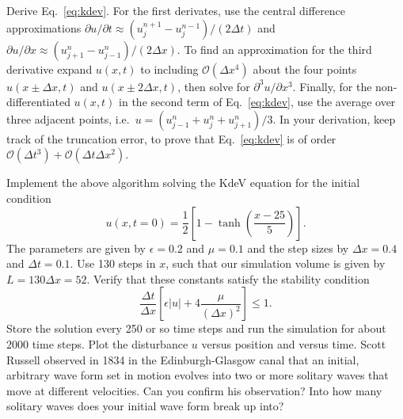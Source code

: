 \documentclass{../project}
\begin{document}
\begin{sheet}[title={Project 4: Partial differential equations (PDEs)}, number=4, due={December 20th, 10am}]
\begin{problem}[title={Solitons}, label=solitons]
  \begin{subproblem}[label=solitons:a,points=4]
    Derive Eq.~\eqref{eq:kdev}. For the first derivates, use the central difference approximations
    $\partial u / \partial t \approx (u_j^{n+1} - u_j^{n-1})/(2\Delta t)$
    and
    $\partial u / \partial x \approx (u_{j+1}^n - u_{j-1}^n)/(2\Delta x)$.
    To find an approximation for the third derivative
    expand $u(x,t)$ to including $\mathcal O(\Delta x^4)$
    about the four points
    $u(x\pm \Delta x, t)$
    and
    $u(x\pm 2\Delta x, t)$,
    then solve for $\partial^3 u / \partial x^3$.
    Finally, for the non-differentiated $u(x,t)$
    in the second term of Eq.~\eqref{eq:kdev},
    use the average over three adjacent points,
    i.e.\ $u = (u_{j-1}^n + u_{j}^n + u_{j+1}^n)/3$.
    In your derivation, keep track of the
    truncation error, to prove that Eq.~\eqref{eq:kdev}
    is of order $\mathcal O(\Delta t^3) + \mathcal O(\Delta t \Delta x^2)$.
  \end{subproblem}

  \begin{subproblem}[label=solitons:b,points=8]
    Implement the above algorithm solving the KdeV equation
    for the initial condition
    \begin{equation}
      u(x,t=0) = \frac12 \left[ 1 - \tanh\left(\frac{x-25}{5}\right)\right].
    \end{equation}
    The parameters are given by $\epsilon = 0.2$ and $\mu=0.1$
    and the step sizes by $\Delta x = 0.4$ and $\Delta t = 0.1$.
    Use 130 steps in $x$, such that our simulation volume
    is given by $L=130\Delta x = 52$.
    Verify that these constants satisfy the stability condition
    \begin{equation}
      \frac{\Delta t}{\Delta x} \left[ \epsilon |u| + 4 \frac{\mu}{(\Delta x)^2}\right] \leq 1.
    \end{equation}
    Store the solution every 250 or so time steps
    and run the simulation for about 2000 time steps.
    Plot the disturbance $u$ versus position and versus time.
    Scott Russell observed in 1834
    in the Edinburgh-Glasgow canal that an initial, arbitrary wave form
    set in motion evolves into two or more solitary waves that move at different velocities.
    Can you confirm his observation?
    Into how many solitary waves does your initial wave form break up into?
  \end{subproblem}


\end{problem}
\end{sheet}
\end{document}
